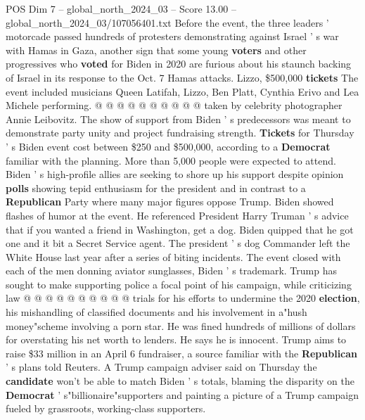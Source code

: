 \begin{textsample}{POS Dim 7 – global\_north\_2024\_03 – Score 13.00 – global\_north\_2024\_03/107056401.txt}
Before the event, the three leaders ' motorcade passed hundreds of protesters demonstrating against Israel ' s war with Hamas in Gaza, another sign that some young \textbf{voters} and other progressives who \textbf{voted} for Biden in 2020 are furious about his staunch backing of Israel in its response to the Oct. 7 Hamas attacks.
Lizzo, \$500,000 \textbf{tickets} The event included musicians Queen Latifah, Lizzo, Ben Platt, Cynthia Erivo and Lea Michele performing. @ @ @ @ @ @ @ @ @ @ taken by celebrity photographer Annie Leibovitz.
The show of support from Biden ' s predecessors was meant to demonstrate party unity and project fundraising strength. \textbf{Tickets} for Thursday ' s Biden event cost between \$250 and \$500,000, according to a \textbf{Democrat} familiar with the planning.
More than 5,000 people were expected to attend.
Biden ' s high-profile allies are seeking to shore up his support despite opinion \textbf{polls} showing tepid enthusiasm for the president and in contrast to a \textbf{Republican} Party where many major figures oppose Trump.
Biden showed flashes of humor at the event.
He referenced President Harry Truman ' s advice that if you wanted a friend in Washington, get a dog.
Biden quipped that he got one and it bit a Secret Service agent.
The president ' s dog Commander left the White House last year after a series of biting incidents.
The event closed with each of the men donning aviator sunglasses, Biden ' s trademark.
Trump has sought to make supporting police a focal point of his campaign, while criticizing law @ @ @ @ @ @ @ @ @ @ trials for his efforts to undermine the 2020 \textbf{election}, his mishandling of classified documents and his involvement in a"hush money"scheme involving a porn star.
He was fined hundreds of millions of dollars for overstating his net worth to lenders.
He says he is innocent.
Trump aims to raise \$33 million in an April 6 fundraiser, a source familiar with the \textbf{Republican} ' s plans told Reuters.
A Trump campaign adviser said on Thursday the \textbf{candidate} won't be able to match Biden ' s totals, blaming the disparity on the \textbf{Democrat} ' s"billionaire"supporters and painting a picture of a Trump campaign fueled by grassroots, working-class supporters.

\end{textsample}
